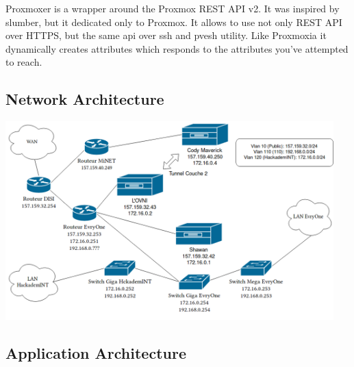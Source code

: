 Proxmoxer is a wrapper around the Proxmox REST API v2.
It was inspired by slumber, but it dedicated only to Proxmox. It allows to use not only REST API over HTTPS, but the same api over ssh and pvesh utility.
Like Proxmoxia it dynamically creates attributes which responds to the attributes you've attempted to reach.
\\



\subsection{Network Architecture}

\vspace{2cm}

\begin{center}
\includegraphics[width=0.95\textwidth]{images/reseau.png}
\end{center}

\pagebreak

\subsection{Application Architecture}

